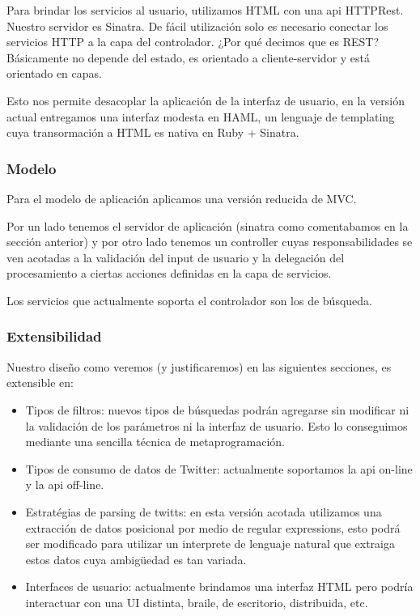 Para brindar los servicios al usuario, utilizamos HTML con una api HTTPRest. Nuestro servidor es Sinatra. De f\'acil utilizaci\'on solo es necesario conectar los servicios HTTP a la capa del controlador. ¿Por qué decimos que es REST? B\'asicamente no depende del estado, es orientado a cliente-servidor y est\'a orientado en capas.

Esto nos permite desacoplar la aplicaci\'on de la interfaz de usuario, en la versi\'on actual entregamos una interfaz modesta en HAML, un lenguaje de templating cuya transormaci\'on a HTML es nativa en Ruby + Sinatra.

\subsubsection{Modelo}

Para el modelo de aplicaci\'on aplicamos una versi\'on reducida de MVC.

Por un lado tenemos el servidor de aplicaci\'on (sinatra como comentabamos en la secci\'on anterior) y por otro lado tenemos un controller cuyas responsabilidades se ven acotadas a la validaci\'on del input de usuario y la delegaci\'on del procesamiento a ciertas acciones definidas en la capa de servicios.

Los servicios que actualmente soporta el controlador son los de b\'usqueda.

\subsubsection{Extensibilidad}

Nuestro dise\~no como veremos (y justificaremos) en las siguientes secciones, es extensible en:

\begin{itemize}
    \item Tipos de filtros: nuevos tipos de b\'usquedas podr\'an agregarse sin modificar ni la validaci\'on de los par\'ametros ni la interfaz de usuario. Esto lo conseguimos mediante una sencilla t\'ecnica de metaprogramaci\'on.
    \item Tipos de consumo de datos de Twitter: actualmente soportamos la api on-line y la api off-line. 
    \item Estrat\'egias de parsing de twitts: en esta versi\'on acotada utilizamos una extracci\'on de datos posicional por medio de regular expressions, esto podr\'a ser modificado para utilizar un interprete de lenguaje natural que extraiga estos datos cuya ambig\"uedad es tan variada.
    \item Interfaces de usuario: actualmente brindamos una interfaz HTML pero podr\'ia interactuar con una UI distinta, braile, de escritorio, distribuida, etc.
\end{itemize}

